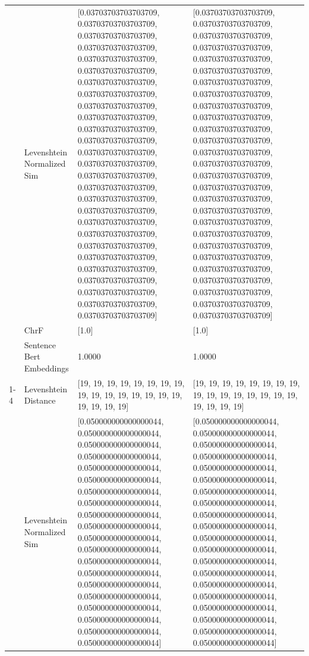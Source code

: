 \begin{tabular}{llll}
 & Levenshtein Normalized Sim & [0.03703703703703709, 0.03703703703703709, 0.03703703703703709, 0.03703703703703709, 0.03703703703703709, 0.03703703703703709, 0.03703703703703709, 0.03703703703703709, 0.03703703703703709, 0.03703703703703709, 0.03703703703703709, 0.03703703703703709, 0.03703703703703709, 0.03703703703703709, 0.03703703703703709, 0.03703703703703709, 0.03703703703703709, 0.03703703703703709, 0.03703703703703709, 0.03703703703703709, 0.03703703703703709, 0.03703703703703709, 0.03703703703703709, 0.03703703703703709, 0.03703703703703709, 0.03703703703703709, 0.03703703703703709] & [0.03703703703703709, 0.03703703703703709, 0.03703703703703709, 0.03703703703703709, 0.03703703703703709, 0.03703703703703709, 0.03703703703703709, 0.03703703703703709, 0.03703703703703709, 0.03703703703703709, 0.03703703703703709, 0.03703703703703709, 0.03703703703703709, 0.03703703703703709, 0.03703703703703709, 0.03703703703703709, 0.03703703703703709, 0.03703703703703709, 0.03703703703703709, 0.03703703703703709, 0.03703703703703709, 0.03703703703703709, 0.03703703703703709, 0.03703703703703709, 0.03703703703703709, 0.03703703703703709, 0.03703703703703709] \\
 & ChrF & [1.0] & [1.0] \\
 & Sentence Bert Embeddings & 1.0000 & 1.0000 \\
\cline{1-4}
\multirow[t]{4}{*}{Amanyira nigo are amarwa k'era rituko.} & Levenshtein Distance & [19, 19, 19, 19, 19, 19, 19, 19, 19, 19, 19, 19, 19, 19, 19, 19, 19, 19, 19, 19] & [19, 19, 19, 19, 19, 19, 19, 19, 19, 19, 19, 19, 19, 19, 19, 19, 19, 19, 19, 19] \\
 & Levenshtein Normalized Sim & [0.050000000000000044, 0.050000000000000044, 0.050000000000000044, 0.050000000000000044, 0.050000000000000044, 0.050000000000000044, 0.050000000000000044, 0.050000000000000044, 0.050000000000000044, 0.050000000000000044, 0.050000000000000044, 0.050000000000000044, 0.050000000000000044, 0.050000000000000044, 0.050000000000000044, 0.050000000000000044, 0.050000000000000044, 0.050000000000000044, 0.050000000000000044, 0.050000000000000044] & [0.050000000000000044, 0.050000000000000044, 0.050000000000000044, 0.050000000000000044, 0.050000000000000044, 0.050000000000000044, 0.050000000000000044, 0.050000000000000044, 0.050000000000000044, 0.050000000000000044, 0.050000000000000044, 0.050000000000000044, 0.050000000000000044, 0.050000000000000044, 0.050000000000000044, 0.050000000000000044, 0.050000000000000044, 0.050000000000000044, 0.050000000000000044, 0.050000000000000044] \\

\end{tabular}
